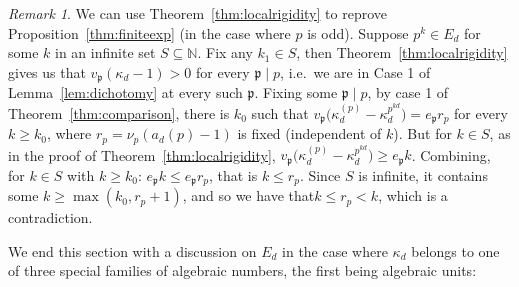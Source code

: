 \documentclass{article}
\theoremstyle{plain}
\theoremstyle{definition}
\theoremstyle{remark}
\newtheorem{remark}[theorem]{Remark}
\begin{document}
\begin{remark}
We can use Theorem~\ref{thm:localrigidity} to reprove Proposition~\ref{thm:finiteexp} (in the case where $p$ is odd). Suppose $p^k\in E_d$ for some $k$ in an infinite set $S \subseteq \mathbb{N}$. Fix any $k_1\in S$, then Theorem~\ref{thm:localrigidity} gives us that $v_\mathfrak p(\kappa_d-1)>0$ for every $\mathfrak p\mid p$, i.e.\ we are in Case 1 of Lemma~\ref{lem:dichotomy} at every such $\mathfrak p$. Fixing some $\mathfrak p\mid p$, by case 1 of Theorem~\ref{thm:comparison}, there is $k_0$ such that $v_\mathfrak p\big(\kappa_d^{(p)}-\kappa_d^{p^{kd}}\big)=e_\mathfrak p r_p$ for every $k\ge k_0$, where $r_p=\nu_p(a_d(p)-1)$ is fixed (independent of $k$). But for $k\in S$, as in the proof of Theorem~\ref{thm:localrigidity}, $v_\mathfrak p\big(\kappa_d^{(p)}-\kappa_d^{p^{kd}}\big)\ge e_\mathfrak pk$. Combining, for $k\in S$ with $k\ge k_0$: $e_\mathfrak pk\le e_\mathfrak pr_p$, that is $k\le r_p$. Since $S$ is infinite, it contains some $k\ge\max(k_0,r_p+1)$, and so we have that$k\le r_p<k$, which is a contradiction.
\end{remark}

We end this section with a discussion on $E_d$ in the case where $\kappa_d$ belongs to one of three special families of algebraic numbers, the first being algebraic units:
\end{document}
